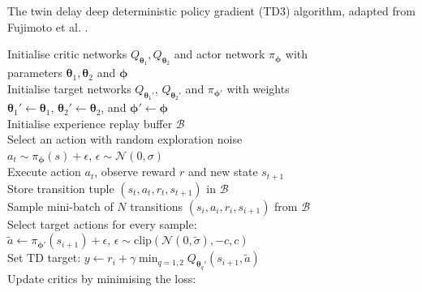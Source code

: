 \begin{algorithm}[hbt!]
\caption[Twin delay deep deterministic policy gradient (TD3)]{The twin delay deep deterministic policy gradient (TD3) algorithm, adapted from Fujimoto et al. \cite{Fujimoto2018}.}\label{alg:td3}
Initialise critic networks $Q_{\bm{\theta}_1}, Q_{\bm{\theta}_2}$ and actor network $\pi_{\bm{\phi}}$ 
with \\
\nonl parameters $\bm{\theta}_1, \bm{\theta}_2$ and $\bm{\phi}$ \\
Initialise target networks $Q_{\bm{\theta}_1'}$, $Q_{\bm{\theta}_2'}$ and $\pi_{\bm{\phi}'}$ with weights \\
\nonl $\bm{\theta}_1' \leftarrow \bm{\theta}_1$, $\bm{\theta}_2' \leftarrow \bm{\theta}_2$, and $\bm{\phi}' \leftarrow \bm{\phi}$ \\
Initialise experience replay buffer $\mathcal{B}$ \\
\vspace{0.5cm}
{
    {
        Select an action with random exploration noise \\
        \nonl $a_t \sim \pi_{\bm{\phi}}(s) + \epsilon$, $\epsilon \sim \mathcal{N}(0, \sigma)$ \\
        Execute action $a_t$, observe reward $r$ and new state $s_{t+1}$ \\
        Store transition tuple $(s_t,a_t,r_t,s_{t+1})$ in $\mathcal{B}$ \\
        \vspace{0.5cm}
        Sample mini-batch of $N$ transitions $(s_i,a_i,r_i,s_{i+1})$ from $\mathcal{B}$ \\
        Select target actions for every sample:\\
        \nonl $\tilde{a} \leftarrow \pi_{\bm{\phi}'}(s_{i+1}) + \epsilon$, $\epsilon \sim \text{clip}(\mathcal{N}(0,\tilde{\sigma}), -c,c)$ \\
        Set TD target:
        $y \leftarrow r_i + \gamma \min_{q=1,2} Q_{\bm{\theta}_q'}(s_{i+1}, \tilde{a})$ \\
        Update critics by minimising the loss: %
}}
\end{algorithm}
